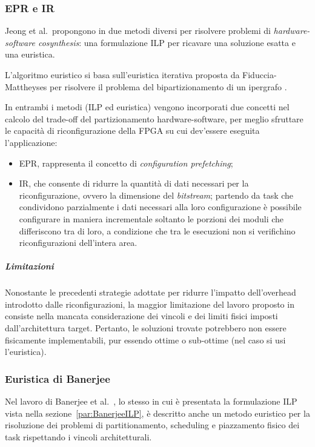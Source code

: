 \subsubsection{\acl{EPR} e \acl{IR}}
Jeong et al.~propongono in \cite{JeongHWSWCosynthesis} due metodi diversi per 
risolvere problemi di \emph{hardware-software cosynthesis}: una formulazione 
\ac{ILP} per ricavare una soluzione esatta e una euristica.

L'algoritmo euristico si basa sull'euristica iterativa proposta da 
Fiduccia-Mattheyses per risolvere il problema del bipartizionamento di un
ipergrafo \cite{FiducciaMattheyses}.


In entrambi i metodi (\ac{ILP} ed euristica) vengono incorporati due concetti 
nel calcolo del trade-off del partizionamento hardware-software, per meglio 
sfruttare le capacità di riconfigurazione della \ac{FPGA} su cui dev'essere
eseguita l'applicazione:
\begin{itemize}
 \item \ac{EPR}, rappresenta il concetto di \emph{configuration prefetching};
 \item \ac{IR}, che consente di ridurre la quantità di dati necessari per la 
riconfigurazione, ovvero la dimensione del \emph{bitstream}; partendo da task 
che condividono parzialmente i dati necessari alla loro configurazione è 
possibile configurare in maniera incrementale soltanto le porzioni dei 
moduli che differiscono tra di loro, a condizione che tra le esecuzioni non si 
verifichino riconfigurazioni dell'intera area.
\end{itemize}

\subparagraph{Limitazioni}
Nonostante le precedenti strategie adottate per ridurre l'impatto dell'overhead 
introdotto dalle riconfigurazioni, la maggior limitazione del lavoro proposto 
in \cite{JeongHWSWCosynthesis} consiste nella mancata considerazione dei 
vincoli e dei limiti fisici imposti dall'architettura target. Pertanto, le 
soluzioni trovate potrebbero non essere fisicamente implementabili, pur essendo 
ottime o sub-ottime (nel caso si usi l'euristica).

\subsubsection{Euristica di Banerjee}
Nel lavoro di Banerjee et al.~\cite{BanerjeePhysicalConstraints}, lo stesso in 
cui è presentata la formulazione \ac{ILP} vista nella sezione~\ref{par:BanerjeeILP}, è 
descritto anche un metodo euristico per la risoluzione dei problemi di 
partitionamento, scheduling e piazzamento fisico dei task rispettando i vincoli 
architetturali.

